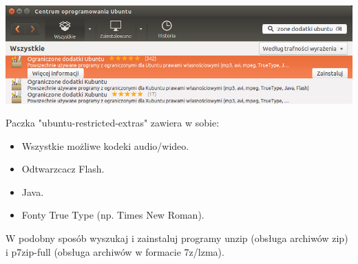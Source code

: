 \begin{center}
	\includegraphics[scale=0.95]{images/pierwsze_uruchomienie_dodatki2.png}
\end{center}

Paczka "ubuntu-restricted-extras" zawiera w sobie:
\begin{itemize}
\item Wszystkie możliwe kodeki audio/wideo.
\item Odtwarzcacz Flash.
\item Java.
\item Fonty True Type (np. Times New Roman).
\end{itemize}

W podobny sposób wyszukaj i zainstaluj programy unzip (obsługa archiwów zip) i p7zip-full (obsługa archiwów w formacie 7z/lzma).
\clearpage